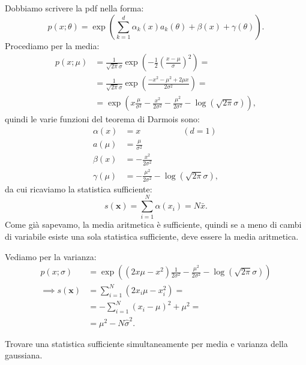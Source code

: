 \begin{solution*}
	Dobbiamo scrivere la pdf nella forma:
	\begin{equation*}
		p(x;\theta)
		= \exp \left( \sum_{k=1}^d \alpha_k(x)a_k(\theta) + \beta(x) + \gamma(\theta) \right).
	\end{equation*}
	Procediamo per la media:
	\begin{align*}
		p(x;\mu)
		&= \frac1{\sqrt{2\pi}\sigma}
		\exp\left( -\frac12 \left(\frac{x-\mu}\sigma\right)^2 \right) = \\
		&= \frac1{\sqrt{2\pi}\sigma}
		\exp\left( \frac{-x^2-\mu^2+2\mu x}{2\sigma^2} \right) = \\
		&= \exp \left( x\frac\mu{\sigma^2} - \frac{x^2}{2\sigma^2}
		 - \frac{\mu^2}{2\sigma^2} - \log(\sqrt{2\pi}\sigma) \right),
	\end{align*}
	quindi le varie funzioni del teorema di Darmois sono:
	\begin{align*}
		\alpha(x) &= x \hspace{5em} (d = 1)\\
		a(\mu) &= \frac{\mu}{\sigma^2} \\
		\beta(x) &= - \frac{x^2}{2\sigma^2} \\
		\gamma(\mu) &= - \frac{\mu^2}{2\sigma^2} - \log(\sqrt{2\pi}\sigma),
	\end{align*}
	da cui ricaviamo la statistica sufficiente:
	\begin{equation*}
		s(\mathbf x)
		= \sum_{i=1}^N \alpha(x_i)
		= N\bar x.
	\end{equation*}
	Come già sapevamo, la media aritmetica è sufficiente,
	quindi se a meno di cambi di variabile esiste una sola statistica sufficiente,
	deve essere la media aritmetica.
	
	Vediamo per la varianza:
	\begin{align*}
		p(x;\sigma)
		&= \exp \left( (2x\mu-x^2)\frac1{2\sigma^2}
		- \frac{\mu^2}{2\sigma^2}
		-\log(\sqrt{2\pi}\sigma) \right) \\
		\implies s(\mathbf x)
		&= \sum_{i=1}^N (2x_i\mu-x_i^2) = \\
		&= -\sum_{i=1}^N (x_i-\mu)^2 + \mu^2 = \\
		&= \mu^2 - N\hat\sigma^2.
	\end{align*}
\end{solution*}

\begin{exercise}
	Trovare una statistica sufficiente simultaneamente per media e varianza della gaussiana.
\end{exercise}


